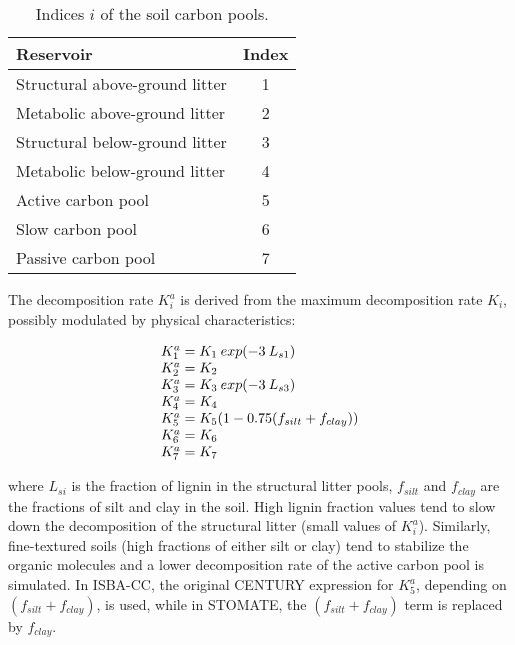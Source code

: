 {\begin{table}[htbp]
\begin{center}
\begin{tabular}{|l|c|}
\hline
Reservoir                        & Index \\
\hline
Structural above-ground litter   & 1 \\
Metabolic above-ground litter    & 2 \\
Structural below-ground litter   & 3 \\
Metabolic below-ground litter    & 4 \\
Active carbon pool               & 5 \\
Slow carbon pool                 & 6 \\
Passive carbon pool              & 7 \\
\hline
\end{tabular}
\end{center}
\caption{\label{tabi}
         Indices $i$ of the soil carbon pools.}
\end{table}

The decomposition rate $K_i^a$ is derived from the maximum 
decomposition rate $K_i$, possibly modulated by physical characteristics:

\begin{equation}
\begin{tabular}{l}
$K_1^a = K_1 \: exp(-3 \: L_{s1}) $ \\
$K_2^a = K_2$ \\
$K_3^a = K_3 \: exp(-3 \: L_{s3}) $ \\
$K_4^a = K_4$ \\
$K_5^a = K_5 (1 - 0.75 (f_{silt}+f_{clay}) ) $ \\
$K_6^a = K_6$ \\
$K_7^a = K_7$ \\
\end{tabular}
\end{equation}

where $L_{si}$ is the fraction of lignin in the structural litter pools, 
$f_{silt}$ and $f_{clay}$ are the fractions of silt and 
clay in the soil.
High lignin fraction values tend to slow down the decomposition of the structural litter 
(small values of $K_i^a$). 
Similarly, fine-textured soils (high fractions of either silt or clay) tend to stabilize 
the organic molecules and a lower decomposition rate of the active carbon pool is simulated.
In ISBA-CC, the original CENTURY expression for $K_5^a$, depending on $(f_{silt}+f_{clay})$, 
is used, while in STOMATE, the $(f_{silt}+f_{clay})$ term is replaced by $f_{clay}$.


}
